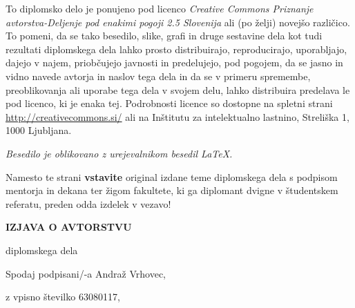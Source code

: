 \documentclass[12pt,a4paper,openany,tikz]{book}
\theoremstyle{plain}
\theoremstyle{definition}
\begin{document}
\vspace*{5cm}
{\small \noindent
To diplomsko delo je ponujeno pod licenco \textit{Creative Commons Priznanje avtorstva-Deljenje pod enakimi pogoji 2.5 Slovenija}
ali (po želji) novejšo različico.
To pomeni, da se tako besedilo, slike, grafi in druge sestavine dela kot tudi rezultati diplomskega dela lahko prosto distribuirajo,
reproducirajo, uporabljajo, dajejo v najem, priobčujejo javnosti in predelujejo, pod pogojem, da se jasno in vidno navede avtorja in naslov tega
dela in da se v primeru spremembe, preoblikovanja ali uporabe tega dela v svojem delu, lahko distribuira predelava le pod
licenco, ki je enaka tej.
Podrobnosti licence so dostopne na spletni strani \url{http://creativecommons.si/} ali na Inštitutu za
intelektualno lastnino, Streliška 1, 1000 Ljubljana.

\begin{center}%
  \hspace*{1ex}
\end{center}
}

\begin{center}
\vfill
{\em
Besedilo je oblikovano z urejevalnikom besedil \LaTeX.
}
\end{center}

\cleardoublepage

Namesto te strani {\bf vstavite} original izdane teme diplomskega dela s podpisom mentorja in dekana ter žigom fakultete, ki ga diplomant
dvigne v študentskem referatu, preden odda izdelek v vezavo!


\cleardoublepage

\vspace{1cm}
\begin{center}
{\Large \textbf{IZJAVA O AVTORSTVU}}
\end{center}

\begin{center}
{\Large diplomskega dela}
\end{center}

\vspace{1cm}
Spodaj podpisani/-a \hspace{0.5cm} Andraž Vrhovec,

\vspace{0.5cm}
z vpisno številko \hspace{0.5cm} 63080117,
\end{document}
